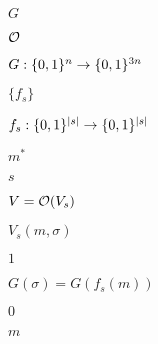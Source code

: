 \documentclass[10pt]{book}
\begin{document}
\begin{mdSnippets}
\begin{mdInlineSnippet}[dfcf28d0734569a6a693bc8194de62bf]%
$G$\end{mdInlineSnippet}%
\begin{mdInlineSnippet}[61066b19cad012b3d19292b825f9607a]%
$\mathcal{O}$\end{mdInlineSnippet}%
\begin{mdInlineSnippet}[c5b1164fd9a7c69c4ebae3970e52c7ba]%
$G:\{0,1\}^n\rightarrow\{0,1\}^{3n}$\end{mdInlineSnippet}%
\begin{mdInlineSnippet}[37a2ce8e5337ae1139e64a8ff1f2f6bb]%
$\{ f_s \}$\end{mdInlineSnippet}%
\begin{mdInlineSnippet}%
$f_s:\{0,1\}^{|s|}\rightarrow\{0,1\}^{|s|}$\end{mdInlineSnippet}%
\begin{mdInlineSnippet}%
$m^*$\end{mdInlineSnippet}%
\begin{mdInlineSnippet}[03c7c0ace395d80182db07ae2c30f034]%
$s$\end{mdInlineSnippet}%
\begin{mdInlineSnippet}[066c2e05d72ea5ab016469de5662850f]%
$V=\mathcal{O}(V_s)$\end{mdInlineSnippet}%
\begin{mdInlineSnippet}%
$V_s(m,\sigma)$\end{mdInlineSnippet}%
\begin{mdInlineSnippet}[c4ca4238a0b923820dcc509a6f75849b]%
$1$\end{mdInlineSnippet}%
\begin{mdInlineSnippet}[691066ee9092bc0e9ab5364aac6c53b3]%
$G(\sigma)=G(f_s(m))$\end{mdInlineSnippet}%
\begin{mdInlineSnippet}%
$0$\end{mdInlineSnippet}%
\begin{mdInlineSnippet}[6f8f57715090da2632453988d9a1501b]%
$m$\end{mdInlineSnippet}%

\end{mdSnippets}
\end{document}
